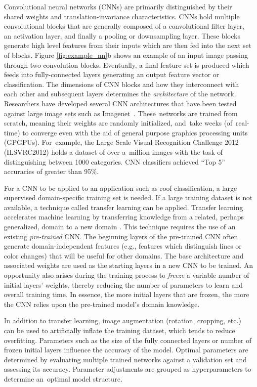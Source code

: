 Convolutional neural networks (CNNs) are primarily distinguished by their shared weights and translation-invariance characteristics.
CNNs hold multiple convolutional blocks that are generally composed of a convolutional filter layer, an activation layer, and finally a pooling or downsampling layer. These blocks generate high level features from their inputs which are then fed into the next set of blocks. Figure \ref{fig:example_nn}b shows an example of an input image passing through two convolution blocks. Eventually, a final feature set is produced which feeds into fully-connected layers generating an output feature vector or classification. The dimensions of \ac{CNN} blocks and how they interconnect with each other and subsequent layers determines the \emph{architecture} of the network. Researchers have developed several \ac{CNN} architectures that have been tested against large image sets such as Imagenet~\cite{russakovsky_imagenet_2015}. These~networks are trained from scratch, meaning their weights are randomly initialized, and~take weeks (of~real-time) to converge even with the aid of general purpose graphics processing units (GPGPUs).  For~example, the Large Scale Visual Recognition Challenge 2012 (ILSVRC2012) holds a dataset of over a~million images with the task of distinguishing between 1000 categories. \ac{CNN} classifiers achieved ``Top 5'' accuracies of greater than 95\%.

For a \ac{CNN} to be applied to an application such as roof classification, a large supervised domain-specific training set is needed. If a large training dataset is not available, a technique called transfer learning can be applied. Transfer learning accelerates machine learning by transferring knowledge from a related, perhaps generalized, domain to a new domain \cite{weiss_survey_2016}. This technique requires the use of an existing \emph{pre-trained} \ac{CNN}.  The beginning layers of the pre-trained \ac{CNN} often generate domain-independent features (e.g., features which distinguish lines or color changes) that will be useful for other domains. The base architecture and associated weights are used as the starting layers in a new \ac{CNN} to be trained. An opportunity also arises during the training process to \emph{freeze} a variable number of initial layers' weights, thereby reducing the number of parameters to learn and overall training time. In essence, the more initial layers that are frozen, the more the \ac{CNN} relies upon the pre-trained model's domain knowledge.  

In addition to transfer learning, image augmentation (rotation, cropping, etc.) can be used to artificially inflate the training dataset, which tends to reduce overfitting. Parameters such as the size of the fully connected layers or number of frozen initial layers influence the accuracy of the model.  Optimal parameters are determined by evaluating multiple trained networks against a validation set and assessing its accuracy. Parameter adjustments are grouped as hyperparameters to determine an~optimal model structure.

